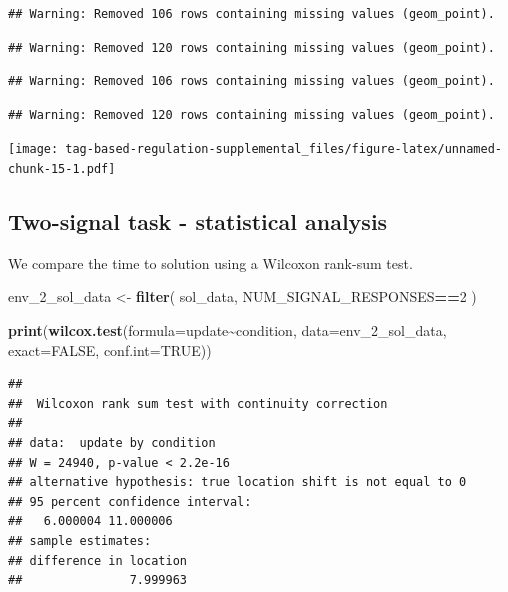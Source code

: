 \documentclass[
]{book}
\newenvironment{Shaded}{\begin{snugshade}}{\end{snugshade}}
\newcommand{\DataTypeTok}[1]{\textcolor[rgb]{0.13,0.29,0.53}{#1}}
\newcommand{\DecValTok}[1]{\textcolor[rgb]{0.00,0.00,0.81}{#1}}
\newcommand{\KeywordTok}[1]{\textcolor[rgb]{0.13,0.29,0.53}{\textbf{#1}}}
\newcommand{\NormalTok}[1]{#1}
\newcommand{\OperatorTok}[1]{\textcolor[rgb]{0.81,0.36,0.00}{\textbf{#1}}}
\newcommand{\OtherTok}[1]{\textcolor[rgb]{0.56,0.35,0.01}{#1}}
\newcommand{\StringTok}[1]{\textcolor[rgb]{0.31,0.60,0.02}{#1}}
\begin{document}
\begin{verbatim}
## Warning: Removed 106 rows containing missing values (geom_point).
\end{verbatim}

\begin{verbatim}
## Warning: Removed 120 rows containing missing values (geom_point).
\end{verbatim}

\begin{verbatim}
## Warning: Removed 106 rows containing missing values (geom_point).
\end{verbatim}

\begin{verbatim}
## Warning: Removed 120 rows containing missing values (geom_point).
\end{verbatim}

\texttt{[image: tag-based-regulation-supplemental\_files/figure-latex/unnamed-chunk-15-1.pdf]}

\hypertarget{two-signal-task---statistical-analysis}{%
\subsection{Two-signal task - statistical analysis}\label{two-signal-task---statistical-analysis}}

We compare the time to solution using a Wilcoxon rank-sum test.

\begin{Shaded}
\begin{Highlighting}[]
\NormalTok{env\_}\DecValTok{2}\NormalTok{\_sol\_data \textless{}{-}}\StringTok{ }\KeywordTok{filter}\NormalTok{(}
\NormalTok{  sol\_data,}
\NormalTok{  NUM\_SIGNAL\_RESPONSES}\OperatorTok{==}\DecValTok{2}
\NormalTok{)}

\KeywordTok{print}\NormalTok{(}\KeywordTok{wilcox.test}\NormalTok{(}\DataTypeTok{formula=}\NormalTok{update}\OperatorTok{\textasciitilde{}}\NormalTok{condition, }\DataTypeTok{data=}\NormalTok{env\_}\DecValTok{2}\NormalTok{\_sol\_data, }\DataTypeTok{exact=}\OtherTok{FALSE}\NormalTok{, }\DataTypeTok{conf.int=}\OtherTok{TRUE}\NormalTok{))}
\end{Highlighting}
\end{Shaded}

\begin{verbatim}
## 
##  Wilcoxon rank sum test with continuity correction
## 
## data:  update by condition
## W = 24940, p-value < 2.2e-16
## alternative hypothesis: true location shift is not equal to 0
## 95 percent confidence interval:
##   6.000004 11.000006
## sample estimates:
## difference in location 
##               7.999963
\end{verbatim}
\end{document}
